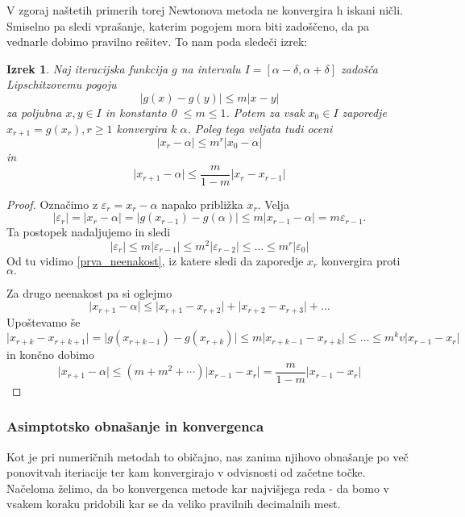 \documentclass[12pt,a4paper]{amsart}
\theoremstyle{definition} %
\theoremstyle{plain} %
\newtheorem{izrek}[definicija]{Izrek}
\begin{document}
V zgoraj naštetih primerih torej Newtonova metoda ne konvergira h iskani ničli. Smiselno pa sledi vprašanje, katerim pogojem mora biti zadoščeno, da pa 
vednarle dobimo pravilno rešitev. To nam poda sledeči izrek:
\begin{izrek} 
    Naj iteracijska funkcija $g$ na intervalu $I = [ \alpha - \delta,\alpha + \delta ]$ zadošča Lipschitzovemu pogoju
    \[
        \lvert g(x) - g(y) \rvert \leq m \lvert x - y \rvert
    \]
    za poljubna $x,y \in I$ in konstanto 0 $\leq m \leq 1$. Potem za vsak $x_{0} \in I$ zaporedje $x_{r+1} = g(x_{r}), r \geq 1$ konvergira k $\alpha$. Poleg tega veljata
    tudi oceni
    \begin{equation}\label{prva_neenakost}
        \lvert x_{r} - \alpha \rvert \leq m^{r}\lvert x_{0} - \alpha \rvert
    \end{equation}
    in
    \begin{equation}
        \lvert x_{r+1} - \alpha \rvert \leq \frac{m}{1-m} \lvert x_{r} - x_{r-1} \rvert
    \end{equation}
\end{izrek}
\begin{proof}
    Označimo z $\varepsilon_{r} = x_{r} - \alpha $ napako približka $x_{r}.$ Velja
    \[
        \lvert \varepsilon_{r} \rvert = \lvert x_{r} - \alpha \rvert = \lvert g(x_{r-1}) - g(\alpha) \rvert \leq m\lvert x_{r-1} - \alpha \rvert = m \varepsilon_{r-1}.
    \]
    Ta postopek nadaljujemo in sledi
    \[
        \lvert \varepsilon_{r} \rvert \leq m \lvert \varepsilon_{r-1} \rvert \leq m^{2} \lvert \varepsilon_{r-2} \rvert \leq \ldots \leq m^{r} \lvert\varepsilon_{0} \rvert
    \]
    Od tu vidimo \eqref{prva_neenakost}, iz katere sledi da zaporedje $x_{r}$ konvergira proti $\alpha.$

    Za drugo neenakost pa si oglejmo
    \[
        \lvert x_{r+1} - \alpha \rvert \leq \lvert x_{r+1} - x_{r+2} \rvert + \lvert x_{r+2} - x_{r+3} \rvert + \ldots
    \]
    Upoštevamo še
    \[
        \lvert x_{r+k} - x_{r+k+1} \rvert = \lvert g(x_{r+k-1}) - g(x_{r+k}) \rvert \leq m \lvert x_{r+k-1} - x_{r+k} \rvert \leq \ldots \leq m^{k}v\lvert x_{r-1} - x_{r}\rvert 
    \]
    in končno dobimo
    \[
        \lvert x_{r+1} - \alpha\rvert \leq (m + m^2 + \cdots)\lvert x_{r-1} - x_{r}\rvert = \frac{m}{1-m}\lvert x_{r-1} - x_{r}\rvert
    \]
\end{proof}

\subsubsection{Asimptotsko obnašanje in konvergenca}
Kot je pri numeričnih metodah to običajno, nas zanima njihovo obnašanje po več ponovitvah iteriacije ter kam konvergirajo v odvisnosti od začetne točke. Načeloma želimo,
da bo konvergenca metode kar najvišjega reda - da bomo v vsakem koraku pridobili kar se da veliko pravilnih decimalnih mest. 
\end{document}
